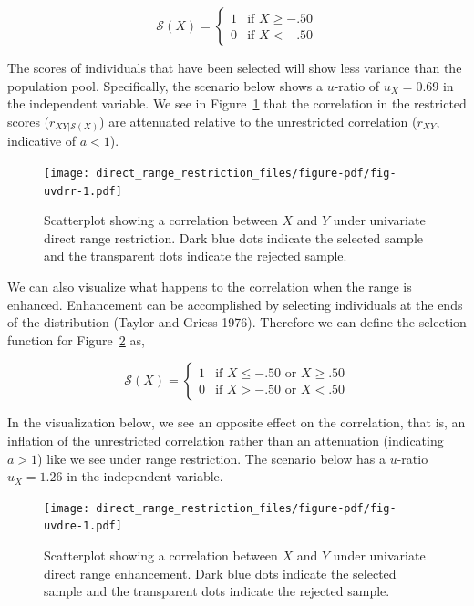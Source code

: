 \documentclass[
  letterpaper,
  DIV=11,
  numbers=noendperiod]{scrreprt}
\begin{document}
\[
\mathcal{S}(X) = \begin{cases}1 & \text{if }X\geq-.50\\ 0 & \text{if }X<-.50  \end{cases}
\]

The scores of individuals that have been selected will show less
variance than the population pool. Specifically, the scenario below
shows a \(u\)-ratio of \(u_X=0.69\) in the independent variable. We see
in Figure~\ref{fig-uvdrr} that the correlation in the restricted scores
(\(r_{XY|\mathcal{S}(X)}\)) are attenuated relative to the unrestricted
correlation (\(r_{XY}\), indicative of \(a<1\)).

\begin{figure}[H]

{\centering \texttt{[image: direct\_range\_restriction\_files/figure-pdf/fig-uvdrr-1.pdf]}

}

\caption{\label{fig-uvdrr}Scatterplot showing a correlation between
\(X\) and \(Y\) under univariate direct range restriction. Dark blue
dots indicate the selected sample and the transparent dots indicate the
rejected sample.}

\end{figure}

We can also visualize what happens to the correlation when the range is
enhanced. Enhancement can be accomplished by selecting individuals at
the ends of the distribution (Taylor and Griess 1976). Therefore we can
define the selection function for Figure~\ref{fig-uvdre} as,

\[
\mathcal{S}(X) = \begin{cases}1 & \text{if }X\leq-.50 \text{ or } X\geq.50\\0 & \text{if }X>-.50 \text{ or } X<.50\end{cases}
\]

In the visualization below, we see an opposite effect on the
correlation, that is, an inflation of the unrestricted correlation
rather than an attenuation (indicating \(a>1\)) like we see under range
restriction. The scenario below has a \(u\)-ratio \(u_X=1.26\) in the
independent variable.

\begin{figure}[H]

{\centering \texttt{[image: direct\_range\_restriction\_files/figure-pdf/fig-uvdre-1.pdf]}

}

\caption{\label{fig-uvdre}Scatterplot showing a correlation between
\(X\) and \(Y\) under univariate direct range enhancement. Dark blue
dots indicate the selected sample and the transparent dots indicate the
rejected sample.}

\end{figure}
\end{document}
